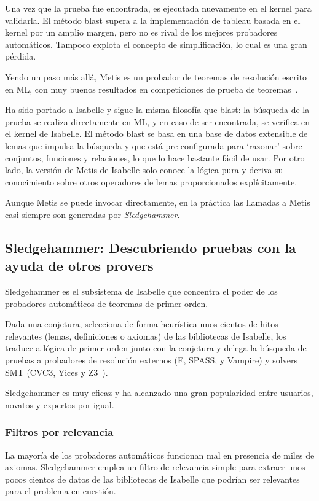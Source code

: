 \documentclass[12pt]{book}
\begin{document}
Una vez que la prueba fue encontrada, es ejecutada nuevamente en el kernel para validarla. El método blast supera a la implementación de tableau basada en el kernel por un amplio margen, pero no es rival de los mejores probadores automáticos. Tampoco explota el concepto de simplificación, lo cual es una gran pérdida.

Yendo un paso más allá, Metis es un probador de teoremas de resolución escrito en ML, con muy buenos resultados en competiciones de prueba de teoremas~\cite{CASC_competition}.

Ha sido portado a Isabelle y sigue la misma filosofía que blast: la búsqueda de la prueba se realiza directamente en ML, y en caso de ser encontrada, se verifica en el kernel de Isabelle.
El método blast se basa en una base de datos extensible de lemas que impulsa la búsqueda y que está pre-configurada para `razonar' sobre conjuntos, funciones y relaciones, lo que lo hace bastante fácil de usar. Por otro lado, la versión de Metis de Isabelle solo conoce la lógica pura y deriva su conocimiento sobre otros operadores de lemas proporcionados explícitamente.

Aunque Metis se puede invocar directamente, en la práctica las llamadas a Metis casi siempre son generadas por \textit{Sledgehammer}.


\subsection{Sledgehammer: Descubriendo pruebas con la ayuda de otros provers}\label{ssec:Sledgehammer}

Sledgehammer es el subsistema de Isabelle que concentra el poder de los probadores automáticos de teoremas de primer orden.

Dada una conjetura, selecciona de forma heurística unos cientos de hitos relevantes (lemas, definiciones o axiomas) de las bibliotecas de Isabelle, los traduce a lógica de primer orden junto con la conjetura y delega la búsqueda de pruebas a probadores de resolución externos (E, SPASS, y Vampire) y solvers SMT (CVC3, Yices y Z3~\cite{Z3}).

Sledgehammer es muy eficaz y ha alcanzado una gran popularidad entre usuarios, novatos y expertos por igual.

\subsubsection{Filtros por relevancia}

La mayoría de los probadores automáticos funcionan mal en presencia de miles de axiomas. Sledgehammer emplea un filtro de relevancia simple para extraer unos pocos cientos de datos de las bibliotecas de Isabelle que podrían ser relevantes para el problema en cuestión.
\end{document}

